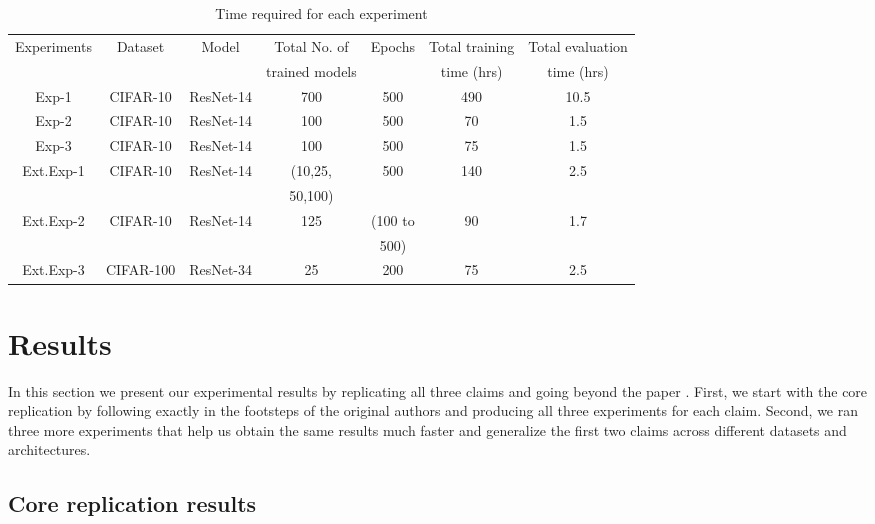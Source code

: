 \begin{table}[!htb]
\centering
	\begin{tabular}{|c|c|c|c|c|c|c|}
	\hline
    Experiments & Dataset & Model & Total No. of& Epochs & Total training & Total evaluation \\
    & & & trained models & & time (hrs)& time (hrs)\\
	\hline
		Exp-1 & CIFAR-10 & ResNet-14 & 700 & 500 & 490 & 10.5 \\
		Exp-2 & CIFAR-10 & ResNet-14 & 100 & 500 & 70  & 1.5\\
	    Exp-3 & CIFAR-10 & ResNet-14 & 100 & 500 & 75  & 1.5\\
	    Ext.Exp-1 & CIFAR-10 & ResNet-14 & (10,25, & 500 & 140 & 2.5\\
	    & & & 50,100)& & & \\
	    Ext.Exp-2 & CIFAR-10 & ResNet-14 & 125 & (100 to & 90  & 1.7\\
	    & & & & 500) & & \\
	    Ext.Exp-3 & CIFAR-100 & ResNet-34 & 25 & 200 & 75  & 2.5\\
		\hline
	\end{tabular}
	\caption{Time required for each experiment}
	\label{table:table3}
\end{table}

\newpage

\section{Results}
\label{sec:Results}
In this section we present our experimental results by replicating all three claims and going beyond the paper \citep{summers2021nondeterminism}. First, we start with the core replication by following exactly in the footsteps of the original authors and producing all three experiments for each claim. Second, we ran three more experiments that help us obtain the same results much faster and generalize the first two claims across different datasets and architectures.


\subsection{Core replication results}
